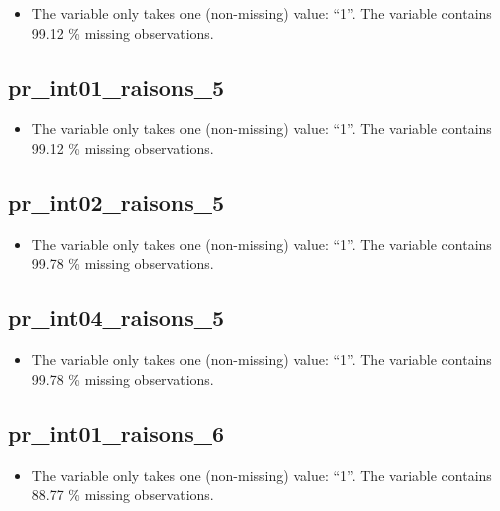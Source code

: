 \documentclass[
  letterpaper,
  DIV=11,
  numbers=noendperiod]{scrartcl}
\providecommand{\tightlist}{%
  \setlength{\itemsep}{0pt}\setlength{\parskip}{0pt}}
\begin{document}
\begin{itemize}
\tightlist
\item
  The variable only takes one (non-missing) value: ``1''. The variable
  contains 99.12 \% missing observations.
\end{itemize}

\fullline

\subsection{pr\_int01\_raisons\_5}\label{pr_int01_raisons_5}

\begin{itemize}
\tightlist
\item
  The variable only takes one (non-missing) value: ``1''. The variable
  contains 99.12 \% missing observations.
\end{itemize}

\fullline

\subsection{pr\_int02\_raisons\_5}\label{pr_int02_raisons_5}

\begin{itemize}
\tightlist
\item
  The variable only takes one (non-missing) value: ``1''. The variable
  contains 99.78 \% missing observations.
\end{itemize}

\fullline

\subsection{pr\_int04\_raisons\_5}\label{pr_int04_raisons_5}

\begin{itemize}
\tightlist
\item
  The variable only takes one (non-missing) value: ``1''. The variable
  contains 99.78 \% missing observations.
\end{itemize}

\fullline

\subsection{pr\_int01\_raisons\_6}\label{pr_int01_raisons_6}

\begin{itemize}
\tightlist
\item
  The variable only takes one (non-missing) value: ``1''. The variable
  contains 88.77 \% missing observations.
\end{itemize}
\end{document}
